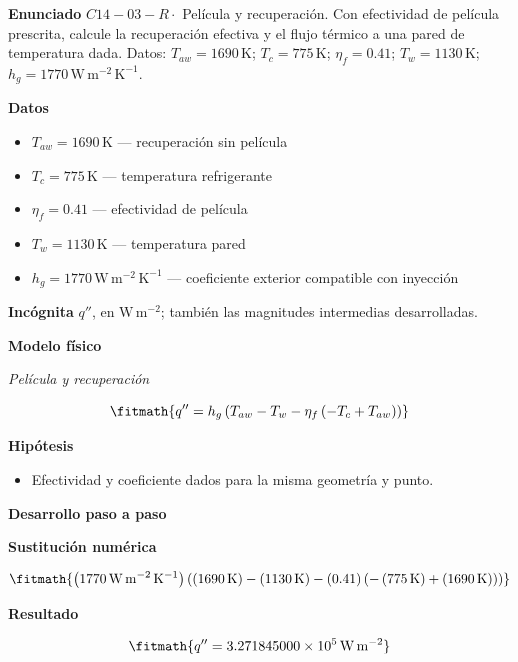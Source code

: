 \documentclass[10pt,openany]{book}
\begin{document}
\begin{tcolorbox}[title={Problema resuelto 3}, studiumworked, breakable]

\noindent\textbf{Enunciado}
\(C14-03-R \cdot\) Película y recuperación. Con efectividad de película prescrita, calcule la recuperación efectiva y el flujo térmico a una pared de temperatura dada. Datos: \(T_{aw}=1690\, \mathrm{K}\); \(T_c=775\, \mathrm{K}\); \(\eta_f=0.41\); \(T_w=1130\, \mathrm{K}\); \(h_g=1770\, \mathrm{W}\,\mathrm{m}^{-2}\,\mathrm{K}^{-1}\).

\noindent\textbf{Datos}
\begin{itemize}
\item $T_{aw} = 1690\,\mathrm{K}$ — recuperación sin película
\item $T_c = 775\,\mathrm{K}$ — temperatura refrigerante
\item $\eta_f = 0.41$ — efectividad de película
\item $T_w = 1130\,\mathrm{K}$ — temperatura pared
\item $h_g = 1770\,\mathrm{W}\,\mathrm{m}^{-2}\,\mathrm{K}^{-1}$ — coeficiente exterior compatible con inyección
\end{itemize}

\noindent\textbf{Incógnita}
$q''$, en $\mathrm{W\,m^{-2}}$; también las magnitudes intermedias desarrolladas.

\noindent\textbf{Modelo físico}

\noindent\textit{Película y recuperación}

\[
\fitmath{q''=h_g \left(T_{aw} - T_w - \eta_f \left(- T_c + T_{aw}\right)\right)}
\]

\noindent\textbf{Hipótesis}
\begin{itemize}
\item Efectividad y coeficiente dados para la misma geometría y punto.
\end{itemize}

\noindent\textbf{Desarrollo paso a paso}



\noindent\textbf{Sustitución numérica}

\[
\fitmath{\left(1770\,\mathrm{W}\,\mathrm{m}^{-2}\,\mathrm{K}^{-1}\right) \left(\left(1690\,\mathrm{K}\right) - \left(1130\,\mathrm{K}\right) - \left(0.41\right) \left(- \left(775\,\mathrm{K}\right) + \left(1690\,\mathrm{K}\right)\right)\right)}
\]

\noindent\textbf{Resultado}

\[
\fitmath{q''=3.271845000\times10^{5}\,\mathrm{W}\,\mathrm{m}^{-2}}
\]


\end{tcolorbox}
\end{document}
